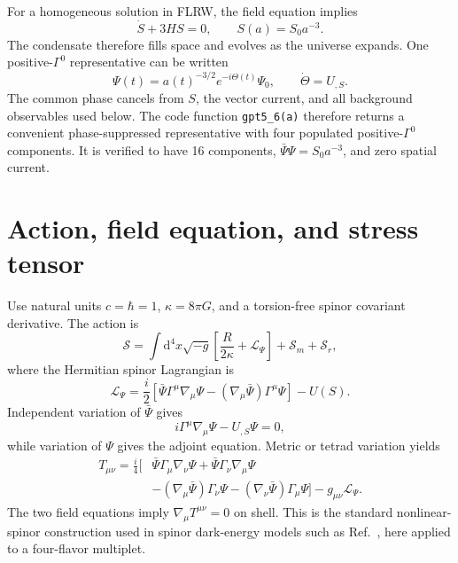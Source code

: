 \documentclass[11pt]{article}
\newcommand{\dd}{\mathrm{d}}
\begin{document}
For a homogeneous solution in FLRW, the field equation implies
\begin{equation}
  \dot S+3HS=0,
  \qquad
  S(a)=S_0a^{-3}.
  \label{eq:bilinear}
\end{equation}
The condensate therefore fills space and evolves as the universe expands.  One
positive-$\Gamma^0$ representative can be written
\begin{equation}
  \Psi(t)=a(t)^{-3/2}e^{-i\Theta(t)}\Psi_0,
  \qquad
  \dot\Theta=U_{,S}.
  \label{eq:phase}
\end{equation}
The common phase cancels from $S$, the vector current, and all background
observables used below.  The code function \texttt{gpt5\_6(a)} therefore
returns a convenient phase-suppressed representative with four populated
positive-$\Gamma^0$ components.  It is verified to have 16 components,
$\bar\Psi\Psi=S_0a^{-3}$, and zero spatial current.

\section{Action, field equation, and stress tensor}

Use natural units $c=\hbar=1$, $\kappa=8\pi G$, and a torsion-free spinor
covariant derivative.  The action is
\begin{equation}
  \mathcal S=\int\dd^4x\sqrt{-g}\left[
  \frac{R}{2\kappa}+\mathcal L_\Psi\right]
  +\mathcal S_m+\mathcal S_r,
  \label{eq:action}
\end{equation}
where the Hermitian spinor Lagrangian is
\begin{equation}
  \mathcal L_\Psi=
  \frac{i}{2}\left[
  \bar\Psi\Gamma^\mu\nabla_\mu\Psi
  -(\nabla_\mu\bar\Psi)\Gamma^\mu\Psi
  \right]-U(S).
  \label{eq:lagrangian}
\end{equation}
Independent variation of $\bar\Psi$ gives
\begin{equation}
  i\Gamma^\mu\nabla_\mu\Psi-U_{,S}\Psi=0,
  \label{eq:dirac}
\end{equation}
while variation of $\Psi$ gives the adjoint equation.  Metric or tetrad
variation yields
\begin{align}
T_{\mu\nu}=\frac{i}{4}\big[&
\bar\Psi\Gamma_\mu\nabla_\nu\Psi
+\bar\Psi\Gamma_\nu\nabla_\mu\Psi \nonumber\\
&-(\nabla_\mu\bar\Psi)\Gamma_\nu\Psi
-(\nabla_\nu\bar\Psi)\Gamma_\mu\Psi\big]
-g_{\mu\nu}\mathcal L_\Psi.
\label{eq:stress}
\end{align}
The two field equations imply $\nabla_\mu T^{\mu\nu}=0$ on shell.  This is the
standard nonlinear-spinor construction used in spinor dark-energy models such
as Ref.~\cite{caiwang}, here applied to a four-flavor multiplet.
\end{document}
